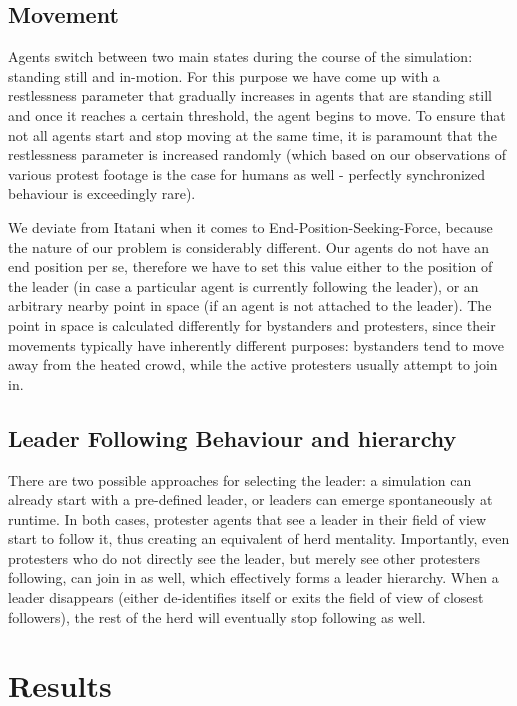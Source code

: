 \documentclass[9pt]{pnas-new}
\begin{document}
\subsection*{Movement}

Agents switch between two main states during the course of the simulation: standing still and in-motion. For this purpose we have come up with a restlessness parameter that gradually increases in agents that are standing still and once it reaches a certain threshold, the agent begins to move. To ensure that not all agents start and stop moving at the same time, it is paramount that the restlessness parameter is increased randomly (which based on our observations of various protest footage is the case for humans as well - perfectly synchronized behaviour is exceedingly rare). 

\bigskip
We deviate from Itatani \cite{socialcrowdsimulation} when it comes to End-Position-Seeking-Force, because the nature of our problem is considerably different. Our agents do not have an end position per se, therefore we have to set this value either to the position of the leader (in case a particular agent is currently following the leader), or an arbitrary nearby point in space (if an agent is not attached to the leader). The point in space is calculated differently for bystanders and protesters, since their movements typically have inherently different purposes: bystanders tend to move away from the heated crowd, while the active protesters usually attempt to join in. 

\subsection*{Leader Following Behaviour and hierarchy} 

There are two possible approaches for selecting the leader: a simulation can already start with a pre-defined leader, or leaders can emerge spontaneously at runtime. In both cases, protester agents that see a leader in their field of view start to follow it, thus creating an equivalent of herd mentality. Importantly, even protesters who do not directly see the leader, but merely see other protesters following, can join in as well, which effectively forms a leader hierarchy. When a leader disappears (either de-identifies itself or exits the field of view of closest followers), the rest of the herd will eventually stop following as well. 

\section*{Results}
\end{document}
